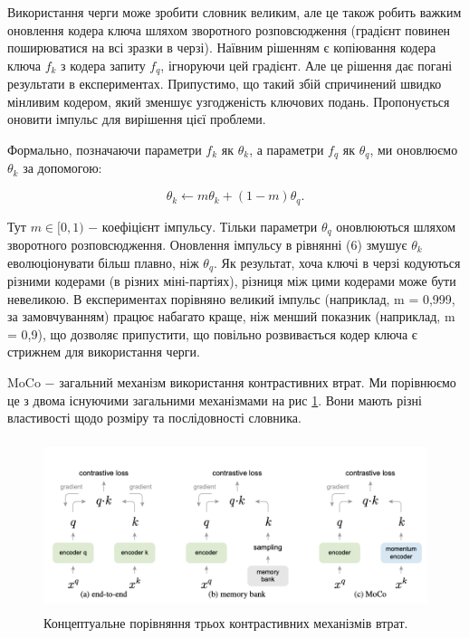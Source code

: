 Використання черги може зробити словник великим, але це також робить важким оновлення кодера ключа шляхом зворотного розповсюдження (градієнт повинен поширюватися на всі зразки в черзі). Наївним рішенням є копіювання кодера ключа $f_{k}$ з кодера запиту $f_{q}$, ігноруючи цей градієнт. Але це рішення дає погані результати в експериментах. Припустимо, що такий збій спричинений швидко мінливим кодером, який зменшує узгодженість ключових подань. Пропонується оновити імпульс для вирішення цієї проблеми.

Формально, позначаючи параметри $f_{k}$ як $\theta_{k}$, а параметри $f_{q}$ як $\theta_{q}$, ми оновлюємо $\theta_{k}$ за допомогою:

\begin{equation}\label{eq:theta_opt}
\theta_{k} \leftarrow m\theta_{k} + (1 - m)\theta_{q}.
\end{equation}

\vspace{1.5em}

Тут $m \in [0, 1)$ $-$ коефіцієнт імпульсу. Тільки параметри $\theta_{q}$ оновлюються шляхом зворотного розповсюдження. Оновлення імпульсу в рівнянні (6) змушує $\theta_{k}$ еволюціонувати більш плавно, ніж $\theta_{q}$. Як результат, хоча ключі в черзі кодуються різними кодерами (в різних міні-партіях), різниця між цими кодерами може бути невеликою. В експериментах порівняно великий імпульс (наприклад, m = 0,999, за замовчуванням) працює набагато краще, ніж менший показник (наприклад, m = 0,9), що дозволяє припустити, що повільно розвивається кодер ключа є стрижнем для використання черги.

MoCo $-$ загальний механізм використання контрастивних втрат. Ми порівнюємо це з двома існуючими загальними механізмами на рис \ref{fig:momentum1}. Вони мають різні властивості щодо розміру та послідовності словника.

\vspace{1em}

\begin{figure}[h]
  \includegraphics[width=\textwidth, height=5cm, natwidth=474, natheight=193]{Mal/momentum1.jpg}
  \caption{Концептуальне порівняння трьох контрастивних механізмів втрат.}
  \label{fig:momentum1}
\end{figure}

